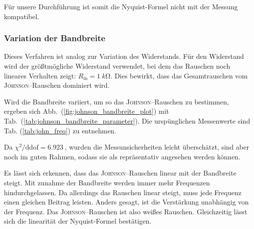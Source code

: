 \documentclass[sn-mathphys-num,iicol]{sn-jnl}
\theoremstyle{thmstyleone}
\theoremstyle{thmstyletwo}
\theoremstyle{thmstylethree}
\begin{document}
Für unsere Durchführung ist somit die Nyquist-Formel nicht mit der Messung kompatibel.

\subsubsection{Variation der Bandbreite}
Dieses Verfahren ist analog zur Variation des Widerstands.
Für den Widerstand wird der größtmögliche Widerstand verwendet, bei dem das Rauschen noch lineares Verhalten zeigt: $R_\text{in}=\SI{1}{k\ohm}$.
Dies bewirkt, dass das Gesamtrauschen vom \textsc{Johnson}--Rauschen dominiert wird.

Wird die Bandbreite variiert, um so das \textsc{Johnson}--Rauschen zu bestimmen, ergeben sich Abb.\ (\ref{fig:johnson_bandbreite_plot}) mit Tab.\ (\ref{tab:johnson_bandbreite_parameter}). Die urspünglichen Messenwerte sind Tab. (\ref{tab:john_freq}) zu entnehmen.

Da $\chi^2/\text{ddof}=\SI{6.923}{}$, wurden die Messunsicherheiten leicht überschätzt, sind aber noch im guten Rahmen, sodass sie als repräsentativ angesehen werden können.

Es lässt sich erkennen, dass das \textsc{Johnson}--Rauschen linear mit der Bandbreite steigt.
Mit zunahme der Bandbreite werden immer mehr Frequenzen hindurchgelassen. Da allerdings das Rauschen linear steigt, muss jede Frequenz einen gleichen Beitrag leisten. Anders gesagt, ist die Verstärkung unabhängig von der Frequenz.
Das \textsc{Johnson}--Rauschen ist also weißes Rauschen. Gleichzeitig lässt sich die linearität der Nyquist-Formel bestätigen.
\end{document}
